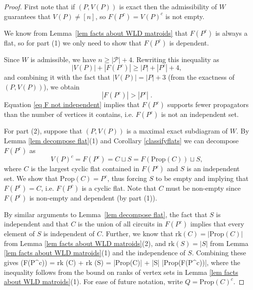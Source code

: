 \documentclass[11pt]{article}
\newcommand{\rk}{\textrm{rk} }
\def\ba #1\ea{\begin{align} #1 \end{align}}
\newcommand{\cP}{\mathcal{P}}
\newcommand{\Prop}{\textrm{Prop}}
\theoremstyle{remark}
\theoremstyle{definition}
\begin{document}
\begin{proof}

First note that if $(P,V(P))$ is exact then the admissibility of $W$ guarantees that $V(P) \neq [n]$, so $F(P^c) = V(P)^c$ is not empty. 

We know from Lemma~\ref{lem facts about WLD matroids} that $F(P^c)$ is always a flat, so for part (1) we only need to show that $F(P^c)$ is dependent.

Since $W$ is admissible, we have $n \geq |\cP| + 4$. Rewriting this inequality as
\[|V(P)| + |F(P^c)|  \geq  |P| + |P^c| +4,\]
and combining it with the fact that $|V(P)| = |P| + 3$ (from the exactness of $(P,V(P))$), we obtain
\begin{equation}\label{eq F not independent}|F(P^c)| > |P^c| \;.\end{equation}
Equation \eqref{eq F not independent} implies that $F(P^c)$ supports fewer propagators than the number of vertices it contains, i.e. $F(P^c)$ is not an independent set.

For part (2), suppose that $(P, V(P))$ is a maximal exact subdiagram of $W$. By Lemma \ref{lem decompose flat}(1) and Corollary \ref{classifyflats} we can decompose $F(P^c)$ as
\begin{equation}\label{eq decompose F}V(P)^c = F(P^c) = C \sqcup S = F(\Prop(C)) \sqcup S,\end{equation}
where $C$ is the largest cyclic flat contained in $F(P^c)$ and $S$ is an independent set. We show that $\Prop(C) = P^c$, thus forcing $S$ to be empty and implying that $F(P^c) = C$, i.e. $F(P^c)$ is a cyclic flat. Note that $C$ must be non-empty since $F(P^c)$ is non-empty and dependent (by part (1)). 

By similar arguments to Lemma~\ref{lem decompose flat}, the fact that $S$ is independent and that $C$ is the union of all circuits in $F(P^c)$ implies that every element of $S$ is independent of $C$. Further, we know that $\rk(C) = |\Prop(C)|$ from Lemma \ref{lem facts about WLD matroids}(2), and $\rk(S) = |S|$ from Lemma \ref{lem facts about WLD matroids}(1) and the independence of $S$.  Combining these gives
\ba \rk\big(F(P^c)\big) = \rk(C) + \rk(S)  = |\Prop(C)| + |S| \leq |\Prop(F(P^c))|\;,\label{rank of comp flat} \ea 
where the inequality follows from the bound on ranks of vertex sets in Lemma \ref{lem facts about WLD matroids}(1). For ease of future notation, write $Q = \Prop(C)^c$. 


\end{proof}
\end{document}
